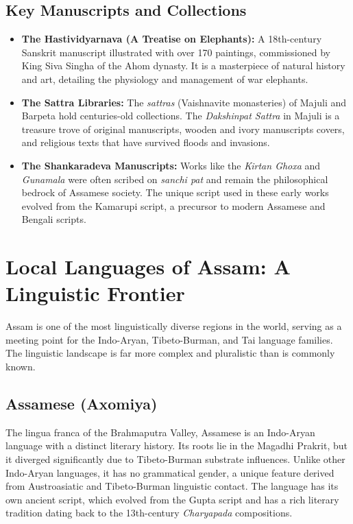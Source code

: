 \documentclass{article}
\begin{document}
\subsection{Key Manuscripts and Collections}
\begin{itemize}
    \item \textbf{The Hastividyarnava (A Treatise on Elephants):} A 18th-century Sanskrit manuscript illustrated with over 170 paintings, commissioned by King Siva Singha of the Ahom dynasty. It is a masterpiece of natural history and art, detailing the physiology and management of war elephants.
    \item \textbf{The Sattra Libraries:} The \textit{sattras} (Vaishnavite monasteries) of Majuli and Barpeta hold centuries-old collections. The \textit{Dakshinpat Sattra} in Majuli is a treasure trove of original manuscripts, wooden and ivory manuscripts covers, and religious texts that have survived floods and invasions.
    \item \textbf{The Shankaradeva Manuscripts:} Works like the \textit{Kirtan Ghoxa} and \textit{Gunamala} were often scribed on \textit{sanchi pat} and remain the philosophical bedrock of Assamese society. The unique script used in these early works evolved from the Kamarupi script, a precursor to modern Assamese and Bengali scripts.
\end{itemize}

\section{Local Languages of Assam: A Linguistic Frontier}
Assam is one of the most linguistically diverse regions in the world, serving as a meeting point for the Indo-Aryan, Tibeto-Burman, and Tai language families. The linguistic landscape is far more complex and pluralistic than is commonly known.

\subsection{Assamese (Axomiya)}
The lingua franca of the Brahmaputra Valley, Assamese is an Indo-Aryan language with a distinct literary history. Its roots lie in the Magadhi Prakrit, but it diverged significantly due to Tibeto-Burman substrate influences. Unlike other Indo-Aryan languages, it has no grammatical gender, a unique feature derived from Austroasiatic and Tibeto-Burman linguistic contact. The language has its own ancient script, which evolved from the Gupta script and has a rich literary tradition dating back to the 13th-century \textit{Charyapada} compositions.
\end{document}
